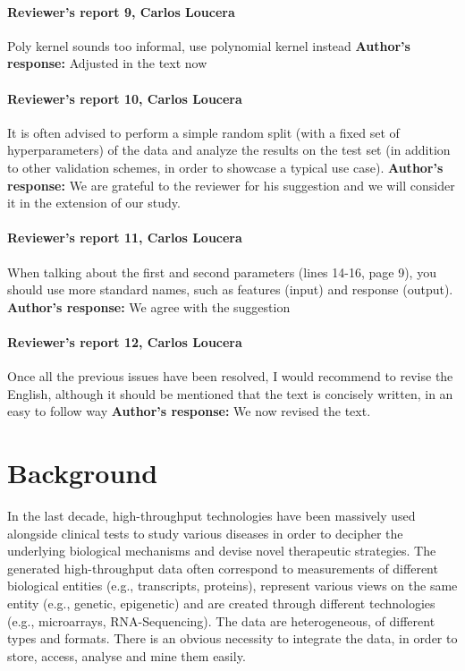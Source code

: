 \documentclass{bmcart}
\begin{document}
\paragraph {Reviewer's report 9, Carlos Loucera}
Poly kernel sounds too informal, use polynomial kernel instead
\newline \textbf{Author's response:}
Adjusted in the text now


\paragraph {Reviewer's report 10, Carlos Loucera}
It is often advised to perform a simple random split (with a fixed set of hyperparameters) of the data and analyze the results on the test set (in addition to other validation schemes, in order to showcase a typical use case).
\newline \textbf{Author's response:}
 We are grateful to the reviewer for his suggestion and we will consider it in the extension of our study.


\paragraph {Reviewer's report 11, Carlos Loucera}
When talking about the first and second parameters (lines 14-16, page 9), you should use more standard names, such as features (input) and response (output).
\newline \textbf{Author's response:}
We agree with the suggestion


\paragraph {Reviewer's report 12, Carlos Loucera}
Once all the previous issues have been resolved, I would recommend to revise the English, although it should be mentioned that the text is concisely written, in an easy to follow way
\newline \textbf{Author's response:}
We now revised the text.


\clearpage
\newpage

\section{Background}

In the last decade, high-throughput technologies have been massively
used alongside clinical tests to study various diseases in order to
decipher the underlying biological mechanisms and devise novel
therapeutic strategies. The generated high-throughput data often
correspond to measurements of different biological entities (e.g.,
transcripts, proteins), represent various views on the same entity
(e.g., genetic, epigenetic) and are created through different
technologies (e.g., microarrays, RNA-Sequencing). The data are
heterogeneous, of different types and formats. There is an obvious
necessity to integrate the data, in order to store, access, analyse and 
mine them easily. 
\end{document}
